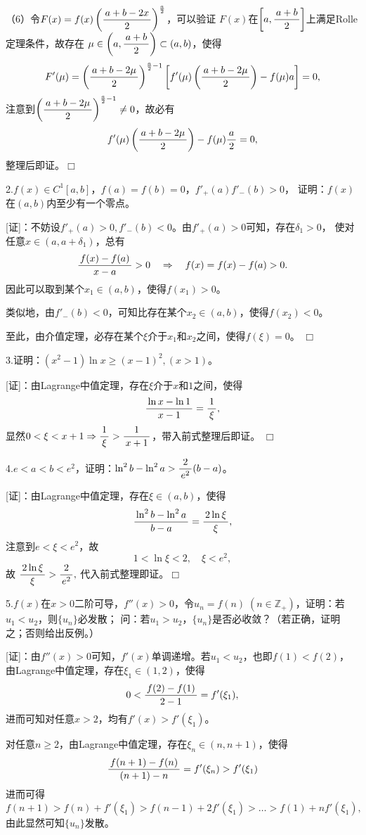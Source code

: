 （6）令$F(x)=f(x)\left(\displaystyle\frac{\,{a+b-2x}\,}{\,{2}\,}\right)^{\frac a2}$，可以验证
$F(x)$在$\left[a,\displaystyle\frac{\,{a+b}\,}{\,{2}\,}\right]$上满足Rolle定理条件，故存在
$\mu\in\left(a,\displaystyle\frac{\,{a+b}\,}{\,{2}\,}\right)\subset(a,b)$，使得
$$F'(\mu)=\left(\displaystyle\frac{\,{a+b-2\mu}\,}{\,{2}\,}\right)^{\frac a2-1}
\left[f'(\mu)\left(\displaystyle\frac{\,{a+b-2\mu}\,}{\,{2}\,}\right)
-f(\mu)a\right]=0,$$
注意到$\left(\displaystyle\frac{\,{a+b-2\mu}\,}{\,{2}\,}\right)^{\frac a2-1}\ne0$，故必有
$$f'(\mu)\left(\displaystyle\frac{\,{a+b-2\mu}\,}{\,{2}\,}\right)-f(\mu)\displaystyle\frac{\,{a}\,}{\,{2}\,}=0,$$
整理后即证。\hfill$\Box$

\bigskip

2.$f(x)\in C^1[a,b]$，$f(a)=f(b)=0$，$f'_+(a)f'_-(b)>0$，
证明：$f(x)$在$(a,b)$内至少有一个零点。

[证]：不妨设$f'_+(a)>0,f'_-(b)<0$。由$f'_+(a)>0$可知，存在$\delta_1>0$，
使对任意$x\in(a,a+\delta_1)$，总有
$$\displaystyle\frac{\,{f(x)-f(a)}\,}{\,{x-a}\,}>0\quad\Rightarrow
\quad f(x)=f(x)-f(a)>0.$$
因此可以取到某个$x_1\in(a,b)$，使得$f(x_1)>0$。

类似地，由$f'_-(b)<0$，可知比存在某个$x_2\in(a,b)$，使得$f(x_2)<0$。

至此，由介值定理，必存在某个$\xi$介于$x_1$和$x_2$之间，使得$f(\xi)=0$。
\hfill$\Box$

\bigskip

3.证明：$(x^2-1)\ln x\geq(x-1)^2,(x>1)$。

[证]：由Lagrange中值定理，存在$\xi$介于$x$和$1$之间，使得
$$\displaystyle\frac{\,{\ln x-\ln 1}\,}{\,{x-1}\,}=\displaystyle\frac{\,{1}\,}{\,{\xi}\,},$$
显然$0<\xi<x+1\Rightarrow\displaystyle\frac{\,{1}\,}{\,{\xi}\,}>\displaystyle\frac{\,{1}\,}{\,{x+1}\,}$，带入前式整理后即证。
\hfill$\Box$

\bigskip

4.$e<a<b<e^2$，证明：$\ln^2b-\ln^2a>\displaystyle\frac{\,{2}\,}{\,{e^2}\,}(b-a)$。

[证]：由Lagrange中值定理，存在$\xi\in(a,b)$，使得
$$\displaystyle\frac{\,{\ln^2b-\ln^2a}\,}{\,{b-a}\,}=\displaystyle\frac{\,{2\ln\xi}\,}{\,{\xi}\,},$$
注意到$e<\xi<e^2$，故
$$1<\ln\xi<2,\quad \xi<e^2,$$
故
$\displaystyle\frac{\,{2\ln\xi}\,}{\,{\xi}\,}>\displaystyle\frac{\,{2}\,}{\,{e^2}\,},$
代入前式整理即证。\hfill$\Box$

\bigskip

5.$f(x)$在$x>0$二阶可导，$f''(x)>0$，令$u_n=f(n)\;
 (n\in\mathbb{Z}_+)$，证明：若$u_1<u_2$，则$\{u_n\}$必发散；
问：若$u_1>u_2$，$\{u_n\}$是否必收敛？（若正确，证明之；否则给出反例。）

[证]：由$f''(x)>0$可知，$f'(x)$单调递增。若$u_1<u_2$，也即$f(1)<f(2)$，
由Lagrange中值定理，存在$\xi_1\in(1,2)$，使得
$$0<\displaystyle\frac{\,{f(2)-f(1)}\,}{\,{2-1}\,}=f'(\xi_1),$$
进而可知对任意$x>2$，均有$f'(x)>f'(\xi_1)$。

对任意$n\geq2$，由Lagrange中值定理，存在$\xi_n\in(n,n+1)$，使得
$$\displaystyle\frac{\,{f(n+1)-f(n)}\,}{\,{(n+1)-n}\,}=f'(\xi_n)>f'(\xi_1)$$
进而可得
$$
f(n+1)>f(n)+f'(\xi_1)>f(n-1)+2f'(\xi_1)>\ldots>f(1)+nf'(\xi_1),
$$
由此显然可知$\{u_n\}$发散。

